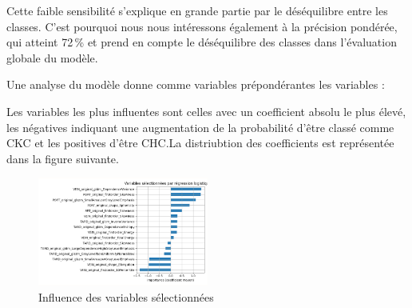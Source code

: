 Cette faible sensibilité s’explique en grande partie par le déséquilibre entre les classes. C’est pourquoi nous nous intéressons également à la précision pondérée, qui atteint 72\,\% et prend en compte le déséquilibre des classes dans l’évaluation globale du modèle.

Une analyse du modèle donne comme variables prépondérantes les variables : 

\begin{table}[H]
    \centering
    \caption{Tableau des variables radiomiques sélectionnées}
    \end{table}
Les variables les plus influentes sont celles avec un coefficient absolu le plus élevé, les négatives indiquant une augmentation de la probabilité d’être classé comme CKC et les positives d'être CHC.La distriubtion des coefficients est représentée dans la figure suivante.
\begin{figure}[H]
    \centering
    \includegraphics[width=0.5\textwidth]{img/variables.png}
    \caption{Influence des variables sélectionnées}
\end{figure}
